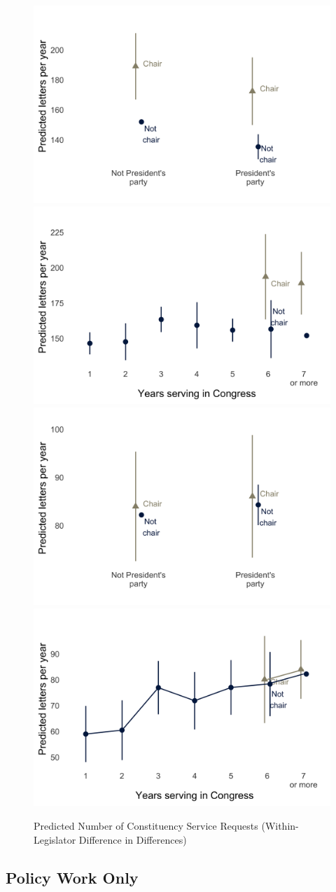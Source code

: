 \documentclass[12pt]{article}
\begin{document}
\begin{figure}[hbt!]
\centering
\caption{Predicted Number of Constituency Service Requests (Within-Legislator Difference in Differences)} \label{f:m-con-predicted}
\includegraphics[width = .49\textwidth]{figs/m-con-predicted-1}
\includegraphics[width = .49\textwidth]{figs/m-con-predicted-2}
\includegraphics[width = .49\textwidth]{figs/m-con-predicted-3}
\includegraphics[width = .49\textwidth]{figs/m-con-predicted-4}

\end{figure}

\subsection{Policy Work Only}
\end{document}
